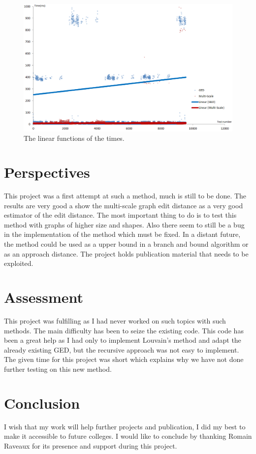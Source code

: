 \documentclass[UTF8, twoside]{EPURapport}
\begin{document}
\begin{figure} [h]
	\centering \includegraphics[width=18cm]{images/GEDvsMultiScaleTimePlot.png}
	\caption {The linear functions of the times.}
	\label {timeplot}
\end{figure}

\chapter{Perspectives}

	\hspace{4ex}This project was a first attempt at such a method, much is still to be done. The results are very good a show the multi-scale graph edit distance as a very good estimator of the edit distance. The most important thing to do is to test this method with graphs of higher size and shapes. Also there seem to still be a bug in the implementation of the method which must be fixed. In a distant future, the method could be used as a upper bound in a branch and bound algorithm or as an approach distance. The project holds publication material that needs to be exploited.

\chapter{Assessment}

	\hspace{4ex}This project was fulfilling as I had never worked on such topics with such methods. The main difficulty has been to seize the existing code. This code has been a great help as I had only to implement Louvain's method and adapt the already existing GED, but the recursive approach was not easy to implement. The given time for this project was short which explains why we have not done further testing on this new method.

\chapter{Conclusion}

	\hspace{4ex}I wish that my work will help further projects and publication, I did my best to make it accessible to future colleges. I would like to conclude by thanking Romain Raveaux for its presence and support during this project.
	
\end{document}
